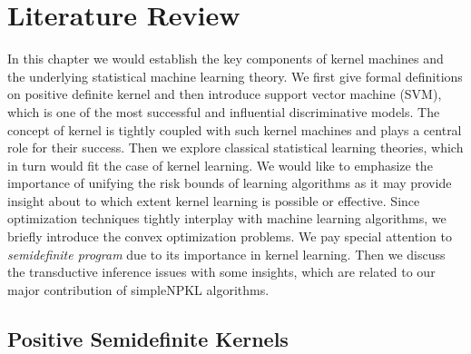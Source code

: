 \newenvironment{remark}
{
    \begin{em}
        \refstepcounter{theorem}
        {\vspace{1ex}\noindent \bf Remark \thetheorem:}
    \end{em}\eop\vspace{1ex}
}

\def{}
\def\XX{{\cal X}}
\def\DD{{\cal D}}
\def\a{{\alpha}}
\def\ba{{\bm{\alpha}}}
\def\bb{{\bm{\beta}}}
\def\I{{\bf I}}
\def\B{{\bf B}}
\def\A{{\bf A}}
\def\L{{\bf L}}
\def\T{{\bf T}}
\def\V{{\bf V}}
\def\v{{\bf v}}
\def\Z{{\bf Z}}
\def\J{{\mathcal J}}
\def\X{{\cal X}}
\def\Y{{\cal Y}}
\def\h{{\cal H}}
\def\k{{\cal K}}
\def\f{{\cal F}}
\def\u{{\cal U}}
\def\eu{{\hat{\u}_n}}
\def\p{{\mathbb P}}
\def\n{{\mathbb N}}
\def\e{{\mathbb E}}
\def\r{{\mathbb R}}
\def\i{{\mathbb I}}
\def\s{{\mathbb S}}


\chapter{Literature Review}\label{chp:background}

In this chapter we would establish the key components of kernel machines and the underlying statistical machine learning theory. We first give formal definitions on positive definite kernel and then introduce support vector machine (SVM), which is one of the most successful and influential discriminative models. The concept of kernel is tightly coupled with such kernel machines and plays a central role for their success. Then we explore classical statistical learning theories, which in turn would fit the case of kernel learning. We would like to emphasize the importance of unifying the risk bounds of learning algorithms as it may provide insight about to which extent kernel learning is possible or effective. Since optimization techniques tightly interplay with machine learning algorithms, we briefly introduce the convex optimization problems. We pay special attention to {\em semidefinite program} due to its importance in kernel learning. Then we discuss the transductive inference issues with some insights, which are related to our major contribution of simpleNPKL algorithms.

\section{Positive Semidefinite Kernels}

